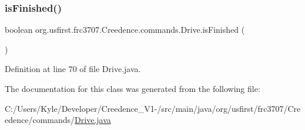 \subsubsection{\texorpdfstring{isFinished()}{isFinished()}}
{\footnotesize\ttfamily boolean org.\+usfirst.\+frc3707.\+Creedence.\+commands.\+Drive.\+is\+Finished (\begin{DoxyParamCaption}{ }\end{DoxyParamCaption})\hspace{0.3cm}{\ttfamily [protected]}}



Definition at line 70 of file Drive.\+java.



The documentation for this class was generated from the following file\+:\begin{DoxyCompactItemize}
\item 
C\+:/\+Users/\+Kyle/\+Developer/\+Creedence\+\_\+\+V1-\//src/main/java/org/usfirst/frc3707/\+Creedence/commands/\mbox{\hyperlink{_drive_8java}{Drive.\+java}}\end{DoxyCompactItemize}
